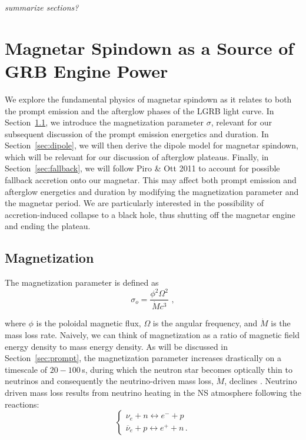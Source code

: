 \documentclass{article}
\begin{document}
\textit{summarize sections?}

\section{Magnetar Spindown as a Source of GRB Engine Power} 
We explore the fundamental physics of magnetar spindown as it relates to both the prompt emission and the afterglow phases of the LGRB light curve. In Section~\ref{sec:magnetization}, we introduce the magnetization parameter $\sigma$, relevant for our subsequent discussion of the prompt emission energetics and duration. In Section~\ref{sec:dipole}, we will then derive the dipole model for magnetar spindown, which will be relevant for our discussion of afterglow plateaus. Finally, in Section~\ref{sec:fallback}, we will follow Piro \& Ott 2011 \cite{Piro:2011ed} to account for possible fallback accretion onto our magnetar. This may affect both prompt emission and afterglow energetics and duration by modifying the magnetization parameter and the magnetar period.  We are particularly interested in the possibility of accretion-induced collapse to a black hole, thus shutting off the magnetar engine and ending the plateau.

\subsection{Magnetization} \label{sec:magnetization}

The magnetization parameter is defined as
\begin{equation}
\sigma_o= \frac{\phi^2 \Omega^2}{\dot{M} c^3}\,\,,
\end{equation}

where $\phi$ is the poloidal  magnetic flux, $\Omega$ is the angular frequency, and $\dot{M}$ is the mass loss rate. Naively, we can think of magnetization as a ratio of magnetic field energy density to mass energy density. As will be discussed in Section~\ref{sec:prompt}, the magnetization parameter increases drastically on a timescale of $20-100$\,s, during which the neutron star becomes optically thin to neutrinos and consequently the neutrino-driven mass loss, $\dot{M}$, declines \cite{Metzger:2010pp}. Neutrino driven mass loss results from neutrino heating in the NS atmosphere following the reactions:
\begin{equation}
\begin{cases}
\nu_e+ n \leftrightarrow e^- + p \\ \overline{\nu}_e+p \leftrightarrow e^+ + n \,.
\end{cases}
\end{equation}
\end{document}
